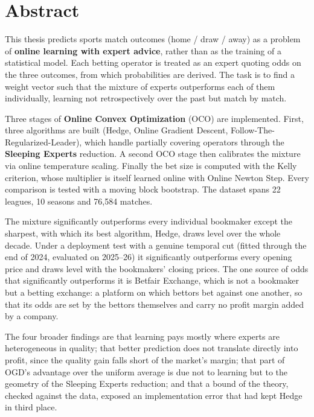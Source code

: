 \documentclass[12pt,a4paper,oneside]{report}
\renewcommand{\_}{\oldunderscore\allowbreak}
\theoremstyle{definition}
\theoremstyle{plain}
\theoremstyle{definition}   %
\begin{document}
\chapter*{Abstract}

This thesis predicts sports match outcomes (home / draw / away) as a problem of
\textbf{online learning with expert advice}, rather than as the training of a statistical
model. Each betting operator is treated as an expert quoting odds on the three outcomes,
from which probabilities are derived. The task is to find a weight vector such that the
mixture of experts outperforms each of them individually, learning not retrospectively over
the past but match by match.

Three stages of \textbf{Online Convex Optimization} (OCO) are implemented. First, three
algorithms are built (Hedge, Online Gradient Descent, Follow-The-Regularized-Leader), which
handle partially covering operators through the \textbf{Sleeping Experts} reduction. A second
OCO stage then calibrates the mixture via online temperature scaling. Finally the bet size is
computed with the Kelly criterion, whose multiplier is itself learned online with Online
Newton Step. Every comparison is tested with a moving block bootstrap. The dataset spans
22 leagues, 10 seasons and 76,584 matches.

The mixture significantly outperforms every individual bookmaker except the sharpest, with
which its best algorithm, Hedge, draws level over the whole decade. Under a deployment test with a
genuine temporal cut (fitted through the end of 2024, evaluated on 2025--26) it significantly
outperforms every opening price and draws level with the bookmakers' closing prices. The one
source of odds that significantly outperforms it is Betfair Exchange, which is not a bookmaker
but a betting exchange: a platform on which bettors bet against one another, so that its odds are
set by the bettors themselves and carry no profit margin added by a company.

The four broader findings are that learning pays mostly where experts are heterogeneous in
quality; that better prediction does not translate directly into profit, since the quality
gain falls short of the market's margin; that part of OGD's advantage over the uniform average
is due not to learning but to the geometry of the Sleeping Experts reduction; and that a bound
of the theory, checked against the data, exposed an implementation error that had kept Hedge
in third place.
\end{document}
